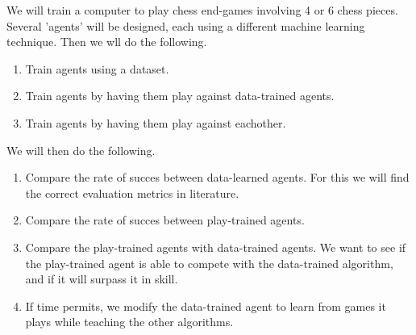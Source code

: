 We will train a computer to play chess end-games involving 4 or 6 chess pieces. 
 Several 'agents' will be
designed, each using a different machine learning technique. Then we wll do the
following.
\begin{enumerate}
    \item Train agents using a dataset.
    \item Train agents by having them play against data-trained agents.
    \item Train agents by having them play against eachother. 
\end{enumerate}
We will then do the following.
\begin{enumerate}
\item Compare the rate of succes between data-learned agents. For this we will
find the correct evaluation metrics in literature.
\item Compare the rate of succes between play-trained agents. 
\item Compare the play-trained agents with data-trained agents.
We want to see if the play-trained agent is able to compete with the
data-trained
algorithm, and if it will surpass it in skill.
\item If time permits, we modify the data-trained agent to learn from 
games it plays while teaching the other algorithms.
\end{enumerate}
